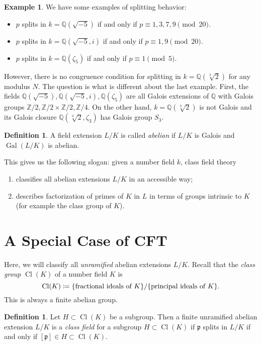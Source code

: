 \documentclass[leqno, openany]{memoir}
\theoremstyle{definition}
\newtheorem{defn}[thm]{Definition}
\newtheorem{exm}[thm]{Example}
\theoremstyle{remark}
\theoremstyle{plain}
\theoremstyle{definition}
\theoremstyle{remark}
\newcommand{\Z}{\mathbb{Z}}
\newcommand{\Q}{\mathbb{Q}}
\newcommand{\mf}[1]{\mathfrak{#1}}
\DeclareMathOperator{\Gal}{Gal}
\DeclareMathOperator{\Cl}{Cl}
\begin{document}
\begin{exm}
    We have some examples of splitting behavior:
    \begin{itemize}
        \item $p$ splits in $k = \Q(\sqrt{-5})$ if and only if $p \equiv 1,3,7,9 \pmod 20$.
        \item $p$ splits in $k = \Q(\sqrt{-5}, i)$ if and only if $p \equiv 1,9 \pmod 20$.
        \item $p$ splits in $k = \Q(\zeta_5)$ if and only if $p \equiv 1 \pmod 5$.
    \end{itemize}
    However, there is no congruence condition for splitting in $k = \Q(\sqrt[3]{2})$ for any modulus $N$. The question is what is different about the last example. First, the fields $\Q(\sqrt{-5}), \Q(\sqrt{-5}, i), \Q(\zeta_5)$ are all Galois extensions of $\Q$ with Galois groups $\Z/2, \Z/2 \times \Z/2, \Z/4$. On the other hand, $k = \Q(\sqrt[3]{2})$ is not Galois and its Galois closure $\Q(\sqrt[3]{2}, \zeta_3)$ has Galois group $S_3$. 
\end{exm}

\begin{defn}
    A field extension $L/K$ is called \textit{abelian} if $L/K$ is Galois and $\Gal(L/K)$ is abelian.
\end{defn}

This gives us the following slogan: given a number field $k$, class field theory
\begin{enumerate}
    \item classifies all abelian extensions $L/K$ in an accessible way;
    \item describes factorization of primes of $K$ in $L$ in terms of groups intrinsic to $K$ (for example the class group of $K$).
\end{enumerate}

\section{A Special Case of CFT}%
\label{sec:a_special_case_of_cft}

Here, we will classify all \textit{unramified} abelian extensions $L/K$. Recall that the \textit{class group} $\Cl(K)$ of a number field $K$ is
\[ \Cl(K) \coloneqq \qty{\text{fractional ideals of $K$}} / \qty{\text{principal ideals of $K$}}. \]
This is always a finite abelian group.

\begin{defn}
    Let $H \subset \Cl(K)$ be a subgroup. Then a finite unramified abelian extension $L/K$ is a \textit{class field} for a subgroup $H \subset \Cl(K)$ if $\mf{p}$ splits in $L/K$ if and only if $[\mf{p}] \in H \subset \Cl(K)$.
\end{defn}
\end{document}
